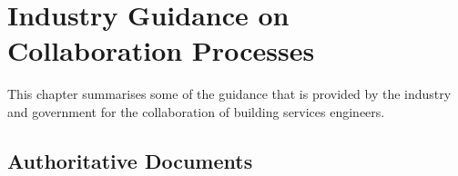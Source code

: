 \chapter{Industry Guidance on Collaboration Processes} %

\label{Chapter8} %



This chapter summarises some of the guidance that is provided by the industry and government for the collaboration of building services engineers.


\section{Authoritative Documents}

